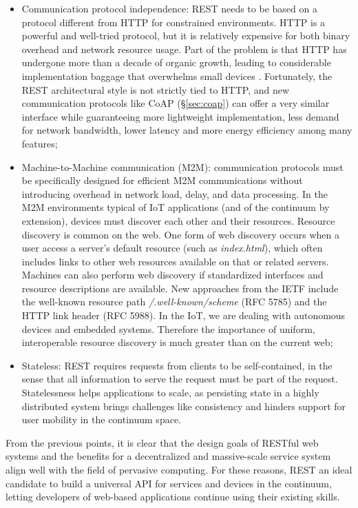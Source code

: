\begin{itemize}
    \item Communication protocol independence: REST needs to be based on a protocol different from HTTP for constrained environments. HTTP is a powerful and well-tried protocol, but it is relatively expensive for both binary overhead and network resource usage. Part of the problem is that HTTP has undergone more than a decade of organic growth, leading to considerable implementation baggage that overwhelms small devices \cite{bormann2012coap}. Fortunately, the REST architectural style is not strictly tied to HTTP, and new communication protocols like CoAP (§\ref{sec:coap}) can offer a very similar interface while guaranteeing more lightweight implementation, less demand for network bandwidth, lower latency and more energy efficiency among many features;
    \item Machine-to-Machine communication (M2M): communication protocols must be specifically designed for efficient M2M communications without introducing overhead in network load, delay, and data processing. In the M2M environments typical of IoT applications (and of the continuum by extension), devices must discover each other and their resources. Resource discovery is common on the web. One form of web discovery occurs when a user access a server's default resource (such as \emph{index.html}), which often includes links to other web resources available on that or related servers. Machines can also perform web discovery if standardized interfaces and resource descriptions are available. New approaches from the IETF include the well-known resource path \emph{/.well-known/scheme} (RFC 5785) and the HTTP link header (RFC 5988). In the IoT, we are dealing with autonomous devices and embedded systems. Therefore the importance of uniform, interoperable resource discovery is much greater than on the current web;
    \item Stateless: REST requires requests from clients to be self-contained, in the sense that all information to serve the request must be part of the request. Statelessness helps applications to scale, as persisting state in a highly distributed system brings challenges like consistency and hinders support for user mobility in the continuum space.
\end{itemize}

From the previous points, it is clear that the design goals of RESTful web systems and the benefits for a decentralized and massive-scale service system align well with the field of pervasive computing. For these reasons, REST an ideal candidate to build a universal API for services and devices in the continuum, letting developers of web-based applications continue using their existing skills. 


